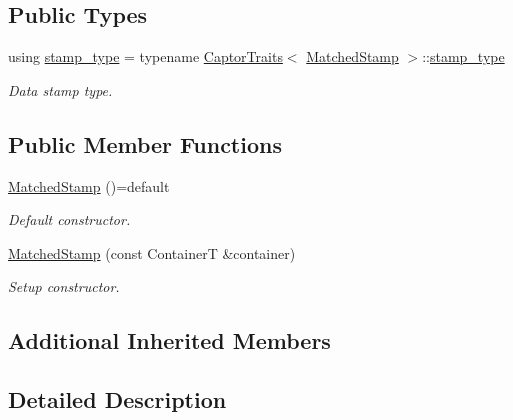 \subsection*{Public Types}
\begin{DoxyCompactItemize}
\item 
\mbox{\label{classflow_1_1follower_1_1_matched_stamp_ae5928b7215a52a12183c2d35566064c0}} 
using \hyperlink{classflow_1_1follower_1_1_matched_stamp_ae5928b7215a52a12183c2d35566064c0}{stamp\+\_\+type} = typename \hyperlink{structflow_1_1_captor_traits}{Captor\+Traits}$<$ \hyperlink{classflow_1_1follower_1_1_matched_stamp}{Matched\+Stamp} $>$\+::\hyperlink{classflow_1_1follower_1_1_matched_stamp_ae5928b7215a52a12183c2d35566064c0}{stamp\+\_\+type}
\begin{DoxyCompactList}\small\item\em Data stamp type. \end{DoxyCompactList}\end{DoxyCompactItemize}
\subsection*{Public Member Functions}
\begin{DoxyCompactItemize}
\item 
\mbox{\label{classflow_1_1follower_1_1_matched_stamp_a4102d69f42d16d013c296ba11d172723}} 
\hyperlink{classflow_1_1follower_1_1_matched_stamp_a4102d69f42d16d013c296ba11d172723}{Matched\+Stamp} ()=default
\begin{DoxyCompactList}\small\item\em Default constructor. \end{DoxyCompactList}\item 
\hyperlink{classflow_1_1follower_1_1_matched_stamp_a6ae585814427bb48fb80b8b21922117c}{Matched\+Stamp} (const ContainerT \&container)
\begin{DoxyCompactList}\small\item\em Setup constructor. \end{DoxyCompactList}\end{DoxyCompactItemize}
\subsection*{Additional Inherited Members}


\subsection{Detailed Description}
